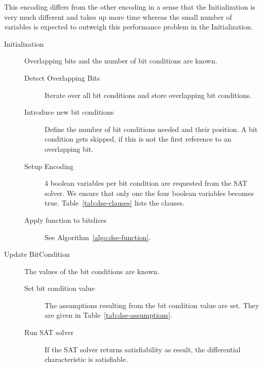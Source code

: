 This encoding differs from the other encoding in a sense that the Initialization is very much different and takes up more time whereas the small number of variables is expected to outweigh this performance problem in the Initialization.
%
\begin{description}
  \item[Initialization] Overlapping bits and the number of bit conditions are known.
    \begin{description}
      \item[Detect Overlapping Bits] Iterate over all bit conditions and store overlapping bit conditions.
      \item[Introduce new bit conditions] Define the number of bit conditions needed and their position. A bit condition gets skipped, if this is not the first reference to an overlapping bit.
      \item[Setup Encoding] $4$ boolean variables per bit condition are requested from the SAT solver. We ensure that only one the four boolean variables becomes true. Table~\ref{tab:dse-clauses} lists the clauses.
      \item[Apply function to bitslices] See Algorithm~\ref{algo:dse-function}.
    \end{description}
  \item[Update BitCondition] The values of the bit conditions are known.
    \begin{description}
      \item[Set bit condition value] The assumptions resulting from the bit condition value are set. They are given in Table~\ref{tab:dse-assumptions}.
      \item[Run SAT solver] If the SAT solver returns satisfiability as result, the differential characteristic is satisfiable.
    \end{description}
\end{description}

